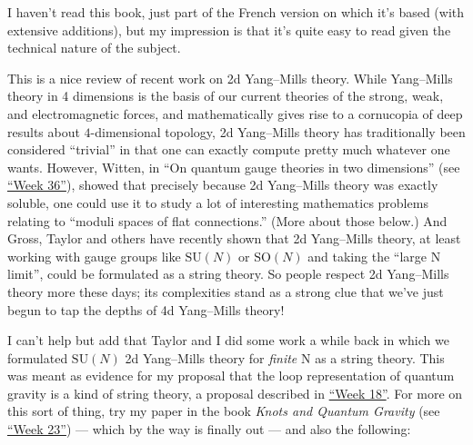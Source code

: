 \documentclass[12pt]{article}
\def\tightlist{}
\renewcommand{\texttt}[1]{%
  \begingroup
  \ttfamily
  \begingroup\lccode`~=`/\lowercase{\endgroup\def~}{/\discretionary{}{}{}}%
  \begingroup\lccode`~=`[\lowercase{\endgroup\def~}{[\discretionary{}{}{}}%
  \begingroup\lccode`~=`.\lowercase{\endgroup\def~}{.\discretionary{}{}{}}%
  \catcode`/=\active\catcode`[=\active\catcode`.=\active
  \scantokens{#1\noexpand}%
  \endgroup
}
\begin{document}
I haven't read this book, just part of the French version on which it's
based (with extensive additions), but my impression is that it's quite
easy to read given the technical nature of the subject.


This is a nice review of recent work on 2d Yang--Mills theory. While
Yang--Mills theory in 4 dimensions is the basis of our current theories
of the strong, weak, and electromagnetic forces, and mathematically
gives rise to a cornucopia of deep results about \(4\)-dimensional
topology, 2d Yang--Mills theory has traditionally been considered
``trivial'' in that one can exactly compute pretty much whatever one
wants. However, Witten, in ``On quantum gauge theories in two
dimensions'' (see \protect\hyperlink{week36}{``Week 36''}), showed that
precisely because 2d Yang--Mills theory was exactly soluble, one could
use it to study a lot of interesting mathematics problems relating to
``moduli spaces of flat connections.'' (More about those below.) And
Gross, Taylor and others have recently shown that 2d Yang--Mills theory,
at least working with gauge groups like \(\mathrm{SU}(N)\) or
\(\mathrm{SO}(N)\) and taking the ``large N limit'', could be formulated
as a string theory. So people respect 2d Yang--Mills theory more these
days; its complexities stand as a strong clue that we've just begun to
tap the depths of 4d Yang--Mills theory!

I can't help but add that Taylor and I did some work a while back in
which we formulated \(\mathrm{SU}(N)\) 2d Yang--Mills theory for
\emph{finite} N as a string theory. This was meant as evidence for my
proposal that the loop representation of quantum gravity is a kind of
string theory, a proposal described in \protect\hyperlink{week18}{``Week
18''}. For more on this sort of thing, try my paper in the book
\emph{Knots and Quantum Gravity} (see \protect\hyperlink{week23}{``Week
23''}) --- which by the way is finally out --- and also the following:

\end{document}
